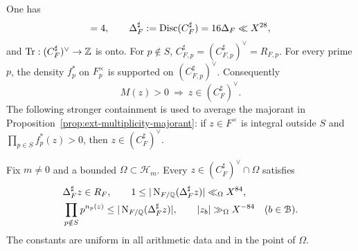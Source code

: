 \begin{lemma}
\label{lem:ext-support}
One has
\begin{equation}
 [C_F:C_F^\sharp]=4,\qquad
 \Delta_F^\sharp:=\Disc(C_F^\sharp)=16\Delta_F\ll X^{28},
 \label{eq:ext-sharp-discriminant}
\end{equation}
and \(\operatorname{Tr}:(C_F^\sharp)^\vee\to\mathbb Z\) is onto.
For \(p\notin S\), \(C_{F,p}^\sharp=(C_{F,p}^\sharp)^\vee=R_{F,p}\).
For every prime \(p\), the density \(f_p^*\) on \(F_p^\times\) is
supported on \((C_{F,p}^\sharp)^\vee\).  Consequently
\[
 M(z)>0\ \Longrightarrow\ z\in(C_F^\sharp)^\vee.
\]
The following stronger containment is used to average the majorant in
Proposition~\ref{prop:ext-multiplicity-majorant}: if \(z\in F^\times\) is
integral outside \(S\) and \(\prod_{p\in S}f_p^*(z)>0\), then
\(z\in(C_F^\sharp)^\vee\).

Fix \(m\ne0\) and a bounded
\(\Omega\subset\mathcal H_m\).  Every
\(z\in(C_F^\sharp)^\vee\cap\Omega\) satisfies
\begin{align}
 &\Delta_F^\sharp z\in R_F,\qquad
 1\le|\operatorname{N}_{F/\mathbb Q}(\Delta_F^\sharp z)|\ll_\Omega X^{84},
       \label{eq:ext-norm-bound}\\
 &\prod_{p\notin S}p^{n_p(z)}
       \le|\operatorname{N}_{F/\mathbb Q}(\Delta_F^\sharp z)|,\qquad
 |z_b|\gg_\Omega X^{-84}\quad(b\in\mathcal B).
 \label{eq:ext-depth-coordinate-bound}
\end{align}
The constants are uniform in all arithmetic data and in the point
of \(\Omega\).
\end{lemma}

